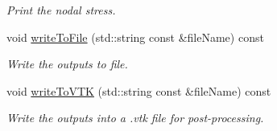\begin{DoxyCompactItemize}
\begin{DoxyCompactList}\small\item\em Print the nodal stress. \end{DoxyCompactList}\item 
\mbox{\label{class_analysis_a0c17471cdbed978e4c4d62718e7b1578}} 
void \mbox{\hyperlink{class_analysis_a0c17471cdbed978e4c4d62718e7b1578}{write\+To\+File}} (std\+::string const \&file\+Name) const
\begin{DoxyCompactList}\small\item\em Write the outputs to file. \end{DoxyCompactList}\item 
\mbox{\label{class_analysis_a7d3b4ec9e261d56df1c70217bacdd404}} 
void \mbox{\hyperlink{class_analysis_a7d3b4ec9e261d56df1c70217bacdd404}{write\+To\+V\+TK}} (std\+::string const \&file\+Name) const
\begin{DoxyCompactList}\small\item\em Write the outputs into a .vtk file for post-\/processing. \end{DoxyCompactList}\end{DoxyCompactItemize}
